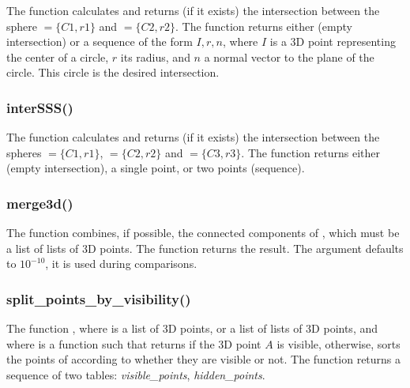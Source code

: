 The function  calculates and returns (if it exists) the intersection between the sphere $=\{C1,r1\}$ and $=\{C2,r2\}$. The function returns either \nil (empty intersection) or a sequence of the form $I,r,n$, where $I$ is a 3D point representing the center of a circle, $r$ its radius, and $n$ a normal vector to the plane of the circle. This circle is the desired intersection.

\subsubsection{interSSS()}

The function  calculates and returns (if it exists) the intersection between the spheres $=\{C1,r1\}$, $=\{C2,r2\}$ and $=\{C3,r3\}$. The function returns either \nil (empty intersection), a single point, or two points (sequence).

\subsubsection{merge3d()}

The function  combines, if possible, the connected components of , which must be a list of lists of 3D points. The function returns the result. The argument  defaults to $10^{-10}$, it is used during comparisons.

\subsubsection{split\_points\_by\_visibility()}

The function , where  is a list of 3D points, or a list of lists of 3D points, and where  is a function such that  returns \true if the 3D point $A$ is visible, \false otherwise, sorts the points of  according to whether they are visible or not. The function returns a sequence of two tables: \emph{visible\_points}, \emph{hidden\_points}.

